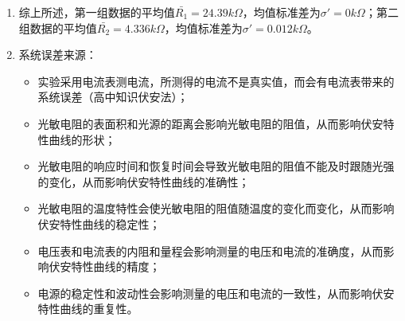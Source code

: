 \documentclass[dvipsnames, svgnames,a4paper,11pt]{article}
\begin{document}
\begin{enumerate}
		而对于第二组，认为8V所对应的数据有粗大误差，剔除后重新计算：均值$\bar{R'}=4.328k\Omega$，测量列标准差$\sigma'=0.019k\Omega$，取显著度$\alpha = 0.01$， 测量次数$n = 5$， 查表得$K(5, 0.01) = 6.53$，由于（数值上）
		\[|\bar{R}-\bar{R'}|=0.0088<K\sigma'\]
		
		则无充分理由认为该数据存在粗大误差，应当予以保留。
		
		观察其他数据，均在平均值附近，不应认为有粗大误差。
		
		\item 综上所述，第一组数据的平均值$\bar{R_1}=24.39k\Omega$，均值标准差为$\sigma'=0k\Omega$；第二组数据的平均值$\bar{R_2}=4.336k\Omega$，均值标准差为$\sigma'=0.012k\Omega$。
		
		\item 系统误差来源：
		\begin{itemize}
			\item 实验采用电流表测电流，所测得的电流不是真实值，而会有电流表带来的系统误差（高中知识伏安法）；
			\item 光敏电阻的表面积和光源的距离会影响光敏电阻的阻值，从而影响伏安特性曲线的形状；
			\item 光敏电阻的响应时间和恢复时间会导致光敏电阻的阻值不能及时跟随光强的变化，从而影响伏安特性曲线的准确性；
			\item 光敏电阻的温度特性会使光敏电阻的阻值随温度的变化而变化，从而影响伏安特性曲线的稳定性；
			\item 电压表和电流表的内阻和量程会影响测量的电压和电流的准确度，从而影响伏安特性曲线的精度；
			\item 电源的稳定性和波动性会影响测量的电压和电流的一致性，从而影响伏安特性曲线的重复性。
		\end{itemize}
	\end{enumerate}
	
	\clearpage
\end{document}
